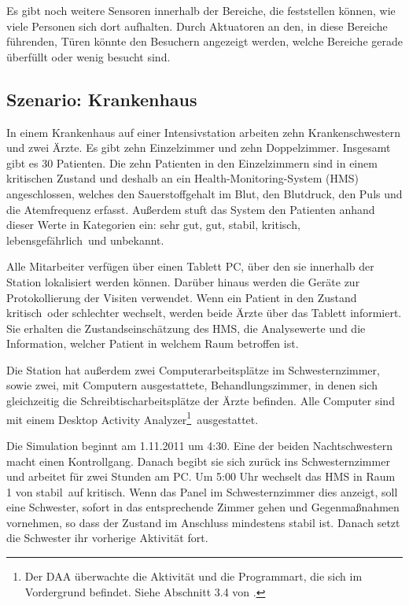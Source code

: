 Es gibt noch weitere Sensoren innerhalb der Bereiche, die feststellen können, wie viele Personen sich dort aufhalten. Durch Aktuatoren an den, in diese Bereiche führenden, Türen könnte den Besuchern angezeigt werden, welche Bereiche gerade überfüllt oder wenig besucht sind.

\subsection*{Szenario: Krankenhaus}

In einem Krankenhaus auf einer Intensivstation arbeiten zehn Krankenschwestern und zwei Ärzte. Es gibt zehn Einzelzimmer und zehn Doppelzimmer. Insgesamt gibt es 30 Patienten. Die zehn Patienten in den Einzelzimmern sind in einem kritischen Zustand und deshalb an ein Health-Monitoring-System (HMS) angeschlossen, welches den Sauerstoffgehalt im Blut, den Blutdruck, den Puls und die Atemfrequenz erfasst. Außerdem stuft das System den Patienten anhand dieser Werte in Kategorien ein: \glqq sehr gut\grqq, \glqq gut\grqq, \glqq stabil\grqq, \glqq kritisch\grqq, \glqq lebensgefährlich\grqq\ und \glqq unbekannt\grqq.

Alle Mitarbeiter verfügen über einen Tablett PC, über den sie innerhalb der Station lokalisiert werden können. Darüber hinaus werden die Geräte zur Protokollierung der Visiten verwendet. Wenn ein Patient in den Zustand \glqq kritisch\grqq\ oder schlechter wechselt, werden beide Ärzte über das Tablett informiert. Sie erhalten die Zustandseinschätzung des HMS, die Analysewerte und die Information, welcher Patient in welchem Raum betroffen ist.

Die Station hat außerdem zwei Computerarbeitsplätze im Schwesternzimmer, sowie zwei, mit Computern ausgestattete, Behandlungszimmer, in denen sich gleichzeitig die Schreibtischarbeitsplätze der Ärzte befinden. Alle Computer sind mit einem \glqq Desktop Activity Analyzer\footnote{Der DAA überwachte die Aktivität und die Programmart, die sich im Vordergrund befindet. Siehe Abschnitt 3.4 von \cite{doku-sensor-aktuator}.}\grqq\ ausgestattet.

Die Simulation beginnt am 1.11.2011 um 4:30. Eine der beiden Nachtschwestern macht einen Kontrollgang. Danach begibt sie sich zurück ins Schwesternzimmer und arbeitet für zwei Stunden am PC. Um 5:00 Uhr wechselt das HMS in Raum 1 von \glqq stabil\grqq\ auf \glqq kritisch\grqq. Wenn das Panel im Schwesternzimmer dies anzeigt, soll eine Schwester, sofort in das entsprechende Zimmer gehen und Gegenmaßnahmen vornehmen, so dass der Zustand im Anschluss mindestens stabil ist. Danach setzt die Schwester ihr vorherige Aktivität fort. 


